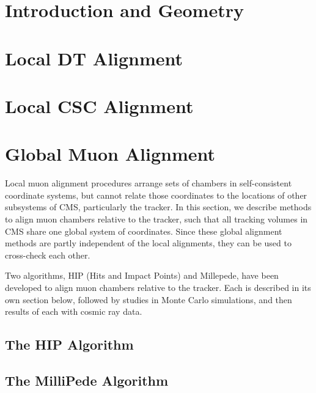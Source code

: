\documentclass[11pt,twoside,a4paper,pdftex,cmspaper]{cms-tdr}
\begin{document}
\section{Introduction and Geometry}


\section{Local DT Alignment}
\label{sec:localdt}


\section{Local CSC Alignment}
\label{sec:localcsc}


\section{Global Muon Alignment}
\label{sec:global_muon_alignment}

Local muon alignment procedures arrange sets of chambers in
self-consistent coordinate systems, but cannot relate those
coordinates to the locations of other subsystems of CMS, particularly
the tracker.  In this section, we describe methods to
align muon chambers relative to the tracker, such that all
tracking volumes in CMS share one global system of coordinates.  Since
these global alignment methods are partly independent of the local alignments,
they can be used to cross-check each other.

Two algorithms, HIP (Hits and Impact Points) and Millepede, have been
developed to align muon chambers relative to the tracker.  Each is
described in its own section below, followed by studies in Monte Carlo
simulations, and then results of each with cosmic ray data.

\subsection{The HIP Algorithm}
\label{sec:hipalgo}
  

\subsection{The MilliPede Algorithm}
  
\end{document}
